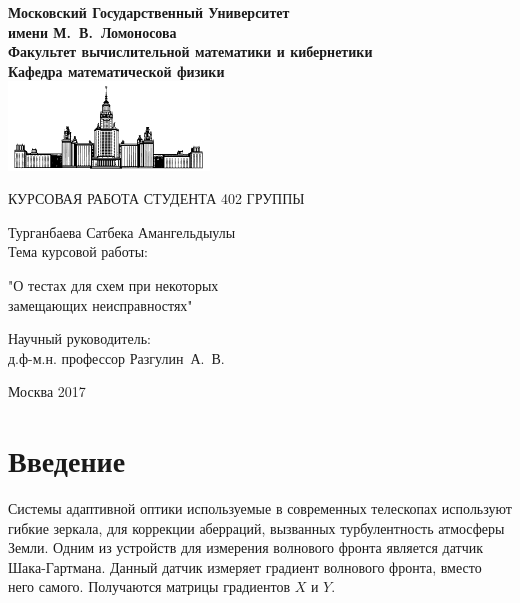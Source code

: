 \documentclass[oneside, final, 14pt]{article}
\begin{document}
\sloppy
	\renewcommand\contentsname{Содержание} %

\begin{titlepage}
\begin{center}
\bfseries
Московский Государственный Университет \\имени М.~В.~Ломоносова\\
Факультет вычислительной математики и кибернетики\\
Кафедра математической физики\\
\includegraphics[width=0.4\textwidth]{msu_logo_small.png}\\
\vfill	

\mdseries
\begin{Large}
КУРСОВАЯ РАБОТА СТУДЕНТА 402 ГРУППЫ\\
\end{Large}
Турганбаева Сатбека Амангельдыулы\\
\vfill	
Тема курсовой работы:\\
\vspace{1cm}
\bfseries
\begin{Large}
"О тестах для схем при некоторых \\	замещающих неисправностях"\\
\end{Large}
\vfill	

  \begin{flushright}
        Научный руководитель:\\
        д.ф-м.н. профессор Разгулин~А.~В.
    \end{flushright}

\vfill	


\end{center}

\begin{center}
	Москва 2017
\end{center}

\end{titlepage}

\tableofcontents

\newpage
\section*{Введение}
Системы адаптивной оптики используемые в современных телескопах используют гибкие зеркала, для коррекции аберраций, вызванных турбулентность атмосферы Земли. Одним из устройств для измерения волнового фронта является датчик Шака-Гартмана. Данный датчик измеряет градиент волнового фронта, вместо него самого. Получаются матрицы градиентов $X$ и $Y$.
\end{document}
